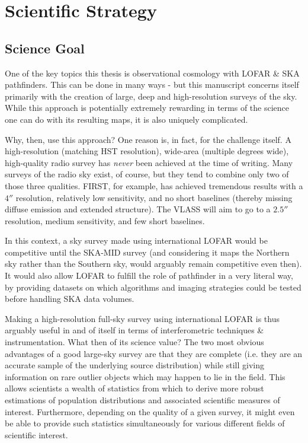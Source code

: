 \chapter{Scientific Strategy}


\section{Science Goal}
\pg
One of the key topics this thesis is observational cosmology with LOFAR \& SKA pathfinders. This can be done in many ways - but this manuscript concerns itself primarily with the creation of large, deep and high-resolution surveys of the sky. While this approach is potentially extremely rewarding in terms of the science one can do with its resulting maps, it is also uniquely complicated.

\pg
Why, then, use this approach? One reason is, in fact, for the challenge itself. A high-resolution (matching HST resolution), wide-area (multiple degrees wide), high-quality radio survey has \emph{never} been achieved at the time of writing. Many surveys of the radio sky exist, of course, but they tend to combine only two of those three qualities. FIRST, for example, has achieved tremendous results with a $4''$ resolution, relatively low sensitivity, and no short baselines (thereby missing diffuse emission and extended structure). The VLASS  will aim to go to a $2.5''$ resolution, medium sensitivity, and few short baselines. %

\pg
In this context, a sky survey made using international LOFAR would be competitive until the SKA-MID survey (and considering it maps the Northern sky rather than the Southern sky, would arguably remain competitive even then). It would also allow LOFAR to fulfill the role of pathfinder in a very literal way, by providing datasets on which algorithms and imaging strategies could be tested before handling SKA data volumes.

\pg
Making a high-resolution full-sky survey using international LOFAR is thus arguably useful in and of itself in terms of interferometric techniques \& instrumentation. What then of its science value? The two most obvious advantages of a good large-sky survey are that they are complete (i.e. they are an accurate sample of the underlying source distribution) while still giving information on rare outlier objects which may happen to lie in the field. This allows scientists a wealth of statistics from which to derive more robust estimations of population distributions and associated scientific measures of interest. Furthermore, depending on the quality of a given survey, it might even be able to provide such statistics simultaneously for various different fields of scientific interest.

